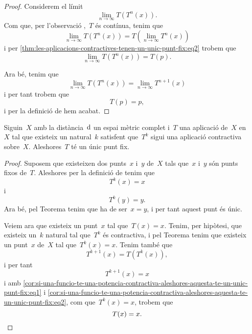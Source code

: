 \documentclass[../../main.tex]{subfiles}
\begin{document}
\begin{proof}
        Considerem el límit
        \[
            \lim_{n\to\infty}T(T^{n}(x)).
        \]
        Com que, per l'observació ,~\(T\) és contínua, tenim que %
        \[
            \lim_{n\to\infty}T(T^{n}(x))=T\left(\lim_{n\to\infty}T^{n}(x)\right)
        \]
        i per \eqref{thm:les-aplicacions-contractives-tenen-un-unic-punt-fix:eq2} trobem que
        \[
            \lim_{n\to\infty}T(T^{n}(x))=T(p).
        \]

        Ara bé, tenim que
        \[
            \lim_{n\to\infty}T(T^{n}(x))=\lim_{n\to\infty}T^{n+1}(x)
        \]
        i per tant trobem que
        \[
            T(p)=p,
        \]
        i per la definició de  hem acabat.
    \end{proof}
    \begin{corollary}
        \label{cor:si-una-funcio-te-una-potencia-contractiva-aleshores-aquesta-te-un-unic-punt-fix}
        Siguin~\(X\) amb la distància~\(\operatorname{d}\) un espai mètric complet i~\(T\) una aplicació de~\(X\) en~\(X\) tal que existeix un natural~\(k\) satisfent que~\(T^{k}\) sigui una aplicació contractiva sobre~\(X\).
        Aleshores~\(T\) té un únic punt fix.
    \end{corollary}
    \begin{proof}
        Suposem que existeixen dos punts~\(x\) i~\(y\) de~\(X\) tals que~\(x\) i~\(y\) són punts fixos de~\(T\).
        Aleshores per la definició de  tenim que
        \[
            T^{k}(x)=x
        \]
        i
        \[
            T^{k}(y)=y.
        \]
        Ara bé, pel Teorema  tenim que ha de ser~\(x=y\), i per tant aquest punt és únic.

        Veiem ara que existeix un punt~\(x\) tal que~\(T(x)=x\).
        Tenim, per hipòtesi, que existeix un~\(k\) natural tal que~\(T^{k}\) és contractiva, i pel Teorema  tenim que existeix un punt~\(x\) de~\(X\) tal que~\(T^{k}(x)=x\).
        Tenim també que
        \begin{equation}
            \label{cor:si-una-funcio-te-una-potencia-contractiva-aleshores-aquesta-te-un-unic-punt-fix:eq1}
            T^{k+1}(x)=T(T^{k}(x)),
        \end{equation}
        i per tant
        \begin{equation}
            \label{cor:si-una-funcio-te-una-potencia-contractiva-aleshores-aquesta-te-un-unic-punt-fix:eq2}
            T^{k+1}(x)=x
        \end{equation}
        i amb \eqref{cor:si-una-funcio-te-una-potencia-contractiva-aleshores-aquesta-te-un-unic-punt-fix:eq1} i \eqref{cor:si-una-funcio-te-una-potencia-contractiva-aleshores-aquesta-te-un-unic-punt-fix:eq2}, com que~\(T^{k}(x)=x\), trobem que
        \[
            T(x)=x.\qedhere
        \]
    \end{proof}
\end{document}
